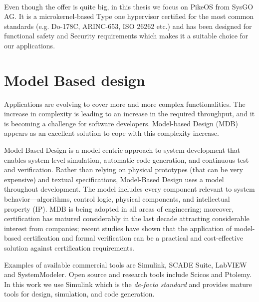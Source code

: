 \paragraph{} Even though the offer is quite big, in this thesis we focus on PikeOS \cite{PikeOS} from SysGO AG. It is a microkernel-based Type one hypervisor certified for the most common standards (e.g. Do-178C, ARINC-653, ISO 26262 etc.) and has been designed for functional safety and Security requirements which makes it a suitable choice for our applications.

\section{Model Based design}

Applications are evolving to cover more and more complex functionalities. The increase in complexity is leading to an increase in the required throughput, and it is becoming a challenge for software developers. Model-based Design (MDB) appears as an excellent solution to cope with this complexity increase.
\par Model-Based Design is a model-centric approach to system development that enables system-level simulation, automatic code generation, and continuous test and verification. Rather than relying on physical prototypes (that can be very expensive) and textual specifications, Model-Based Design uses a model throughout development. The model includes every component relevant to system behavior—algorithms, control logic, physical components, and intellectual property (IP). MDB is being adopted in all areas of engineering; moreover, certification has matured considerably in the last decade attracting considerable interest from companies; recent studies \cite{mbdaerospaceverification} have shown that the application of model-based certification and formal verification can be a practical and cost-effective solution against certification requirements.
\par Examples of available commercial tools are Simulink\textregistered \cite{Simulink}, SCADE Suite\textregistered \cite{Scade}, LabVIEW\textregistered \cite{Labview} and SystemModeler\textregistered \cite{Modeler}. Open source and research tools include Scicos \cite{Scicos} and Ptolemy\cite{Ptolemy}. In this work we use Simulink which is the \emph{de-facto standard} and provides mature tools for design, simulation, and code generation.

